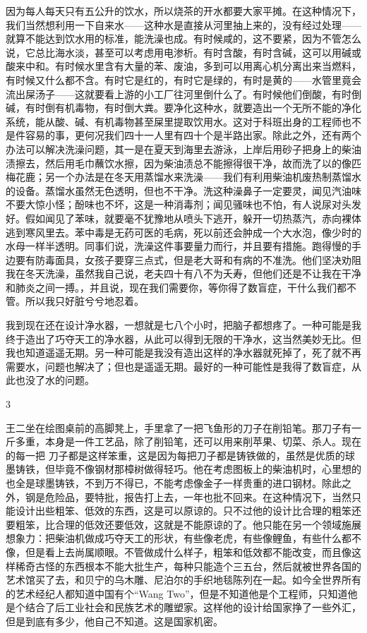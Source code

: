 因为每人每天只有五公升的饮水，所以烧茶的开水都要大家平摊。在这种情况下，我们当然想利用一下自来水——这种水是直接从河里抽上来的，没有经过处理——就算不能达到饮水用的标准，能洗澡也成。有时候咸的，这不要紧，因为不管怎么说，它总比海水淡，甚至可以考虑用电渗析。有时含酸，有时含碱，这可以用碱或酸来中和。有时候水里含有大量的苯、废油，多到可以用离心机分离出来当燃料，有时候又什么都不含。有时它是红的，有时它是绿的，有时是黄的——水管里竟会流出屎汤子——这就要看上游的小工厂往河里倒什么了。有时候他们倒酸，有时倒碱，有时倒有机毒物，有时倒大粪。要净化这种水，就要造出一个无所不能的净化系统，能从酸、碱、有机毒物甚至屎里提取饮用水。这对于科班出身的工程师也不是件容易的事，更何况我们四十一人里有四十个是半路出家。除此之外，还有两个办法可以解决洗澡问题，其一是在夏天到海里去游泳，上岸后用砂子把身上的柴油渍擦去，然后用毛巾蘸饮水擦，因为柴油渍总不能擦得很干净，故而洗了以的像匹梅花鹿；另一个办法是在冬天用蒸馏水来洗澡——我们有利用柴油机废热制蒸馏水的设备。蒸馏水虽然无色透明，但也不干净。洗这种澡鼻子一定要灵，闻见汽油味不要大惊小怪；酚味也不坏，这是一种消毒剂；闻见骚味也不怕，有人说尿对头发好。假如闻见了苯味，就要毫不犹豫地从喷头下逃开，躲开一切热蒸汽，赤向裸体逃到寒风里去。苯中毒是无药可医的毛病，死以前还会肿成一个大水泡，像少时的水母一样半透明。同事们说，洗澡这件事要量力而行，并且要有措施。跑得慢的手边要有防毒面具，女孩子要穿三点式，但是老大哥和有病的不准洗。他们坚决劝阻我在冬天洗澡，虽然我自己说，老夫四十有八不为夭寿，但他们还是不让我在干净和肺炎之间一搏。，并且说，现在我们需要你，等你得了数盲症，干什么我们都不管。所以我只好脏兮兮地忍着。 

我到现在还在设计净水器，一想就是七八个小时，把脑子都想疼了。一种可能是我终于造出了巧夺天工的净水器，从此可以得到无限的干净水，这当然美妙无比。但我也知道遥遥无期。另一种可能是我没有造出这样的净水器就死掉了，死了就不再需要水，问题也解决了；但也是遥遥无期。最好的一种可能性是我得了数盲症，从此也没了水的问题。 



3 

王二坐在绘图桌前的高脚凳上，手里拿了一把飞鱼形的刀子在削铅笔。那刀子有一斤多重，本身是一件工艺品，除了削铅笔，还可以用来削苹果、切菜、杀人。现在的每一把 刀子都是这样笨重，这是因为每把刀子都是铸铁做的，虽然是优质的球墨铸铁，但毕竟不像钢材那樟树做得轻巧。他在考虑图板上的柴油机时，心里想的也全是球墨铸铁，不到万不得已，不能考虑像金子一样贵重的进口钢材。除此之外，钢是危险品，要特批，报告打上去，一年也批不回来。在这种情况下，当然只能设计出些粗笨、低效的东西，这是可以原谅的。只不过他的设计比合理的粗笨还要粗笨，比合理的低效还要低效，这就是不能原谅的了。他只能在另一个领域施展想象力：把柴油机做成巧夺天工的形状，有些像老虎，有些像鲤鱼，有些什么都不像，但是看上去尚属顺眼。不管做成什么样子，粗笨和低效都不能改变，而且像这样稀奇古怪的东西根本不能大批生产，每种只能造个三五台，然后就被世界各国的艺术馆买了去，和贝宁的乌木雕、尼泊尔的手织地毯陈列在一起。如今全世界所有的艺术经纪人都知道中国有个“Wang Two”，但是不知道他是个工程师，只知道他是个结合了后工业社会和民族艺术的雕塑家。这样他的设计给国家挣了一些外汇，但是到底有多少，他自己不知道。这是国家机密。 

